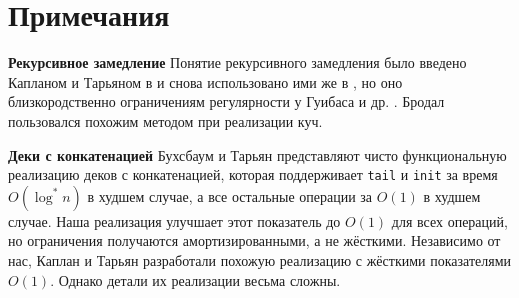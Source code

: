 \section{Примечания}
\label{sc:11.3}

\noindent
\textbf{Рекурсивное замедление} Понятие рекурсивного замедления было
введено Капланом и Тарьяном в \cite{KaplanTarjan1995} и снова
использовано ими же в \cite{KaplanTarjan1996b}, но оно
близкородственно ограничениям регулярности у Гуибаса и
др. \cite{Guibas-etal1977}. Бродал \cite{Brodal1995} пользовался
похожим методом при реализации куч.

\textbf{Деки с конкатенацией} Бухсбаум и Тарьян
\cite{BuchsbaumTarjan1995} представляют чисто функциональную
реализацию деков с конкатенацией, которая поддерживает
\lstinline!tail! и \lstinline!init! за время $O(\log^* n)$ в худшем
случае, а все остальные операции за $O(1)$ в худшем случае. Наша
реализация улучшает этот показатель до $O(1)$ для всех операций, но
ограничения получаются амортизированными, а не жёсткими. Независимо от
нас, Каплан и Тарьян разработали похожую реализацию с жёсткими
показателями $O(1)$. Однако детали их реализации весьма сложны.

